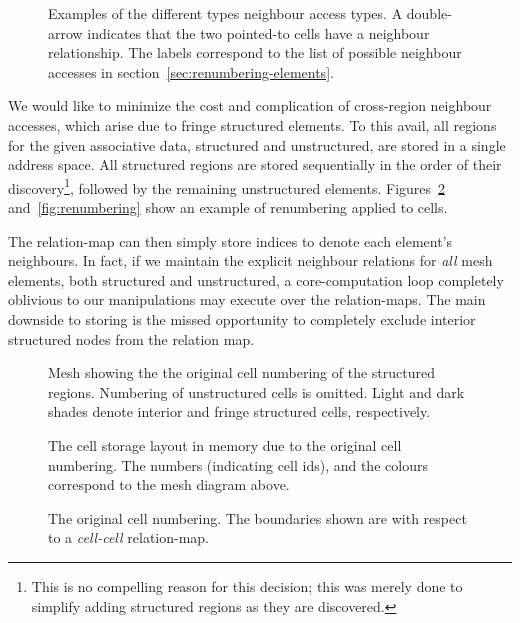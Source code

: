 \begin{figure}
	
	\caption{Examples of the different types neighbour access types. A double-arrow indicates that the two pointed-to cells have a neighbour relationship. The labels correspond to the list of possible neighbour accesses in section~\ref{sec:renumbering-elements}.}
	\label{fig:neighbour-types}
\end{figure}

We would like to minimize the cost and complication of cross-region neighbour accesses, which arise due to fringe structured elements. To this avail, all regions for the given associative data, structured and unstructured, are stored in a single address space. All structured regions are stored sequentially in the order of their discovery\footnote{This is no compelling reason for this decision; this was merely done to simplify adding structured regions as they are discovered.}, followed by the remaining unstructured elements. Figures~\ref{fig:original-numbering} and~\ref{fig:renumbering} show an example of renumbering applied to cells.

The relation-map can then simply store indices to denote each element's neighbours. In fact, if we maintain the explicit neighbour relations for \emph{all} mesh elements, both structured and unstructured, a core-computation loop completely oblivious to our manipulations may execute over the relation-maps.
The main downside to storing is the missed opportunity to completely exclude interior structured nodes from the relation map.




\newlength{\charheight}

\begin{figure}[H]
\sidebysidevertical
{
	
	\caption{Mesh showing the the original cell numbering of the structured regions. Numbering of unstructured cells is omitted. Light and dark shades denote interior and fringe structured cells, respectively.}
}
{
	\small
	\tabcolsep=0.32mm
	
	\caption{The cell storage layout in memory due to the original cell numbering. The numbers (indicating cell ids), and the colours correspond to the mesh diagram above.}
}
\caption{The original cell numbering. The boundaries shown are with respect to a \emph{cell-cell} relation-map.}
\label{fig:original-numbering}
\end{figure}


